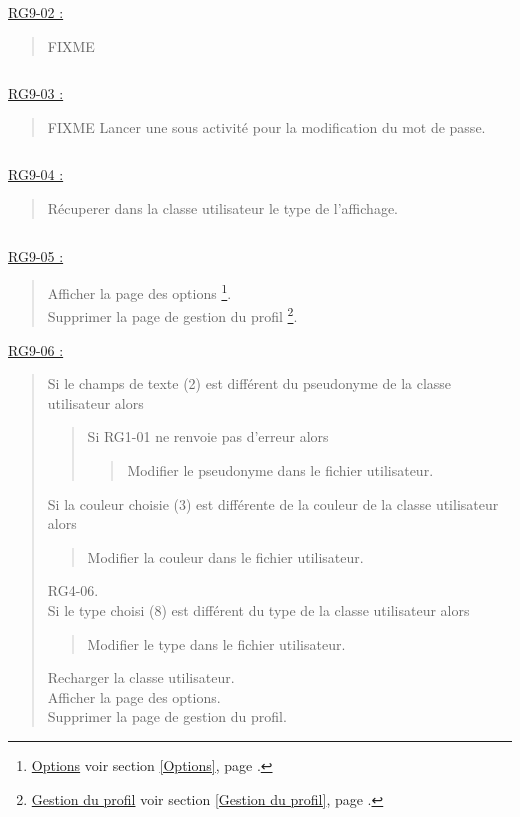 \documentclass{report}
\begin{document}
			$\,$

			\underline{RG9-02 :}
				\begin{quote}
					FIXME
				\end{quote}

			$\,$

			\underline{RG9-03 :}
				\begin{quote}
					FIXME
					Lancer une sous activité pour la modification du mot de passe.
				\end{quote}

			$\,$

			\underline{RG9-04 :}
				\begin{quote}
					Récuperer dans la classe utilisateur le type de l'affichage.
				\end{quote}

			$\,$
				
			\underline{RG9-05 :}
				\begin{quote}
					Afficher la page des options%
						\footnote[1]{
							\hyperlink{Options}{Options}
							\og voir section \ref{Options}, page \pageref{Options}.\fg
						}.\\
					Supprimer la page de gestion du profil%
						\footnote[2]{
							\hyperlink{Gestion du profil}{Gestion du profil}
							\og voir section \ref{Gestion du profil}, page \pageref{Gestion du profil}.\fg
						}.
				\end{quote}
				
			\underline{RG9-06 :}
				\begin{quote}
					Si le champs de texte (2) est différent du pseudonyme de la classe utilisateur alors
					\begin{quote}
						Si RG1-01 ne renvoie pas d'erreur alors
						\begin{quote}
							Modifier le pseudonyme dans le fichier utilisateur.
						\end{quote}
					\end{quote}
					Si la couleur choisie (3) est différente de la couleur de la classe utilisateur alors
					\begin{quote}
						Modifier la couleur dans le fichier utilisateur.
					\end{quote}	
					RG4-06.\\
					Si le type choisi (8) est différent du type de la classe utilisateur alors
					\begin{quote}
						Modifier le type dans le fichier utilisateur.
					\end{quote}	
					Recharger la classe utilisateur.\\
					Afficher la page des options\footnotemark[1].\\
					Supprimer la page de gestion du profil\footnotemark[2].
				\end{quote}
				
\end{document}

